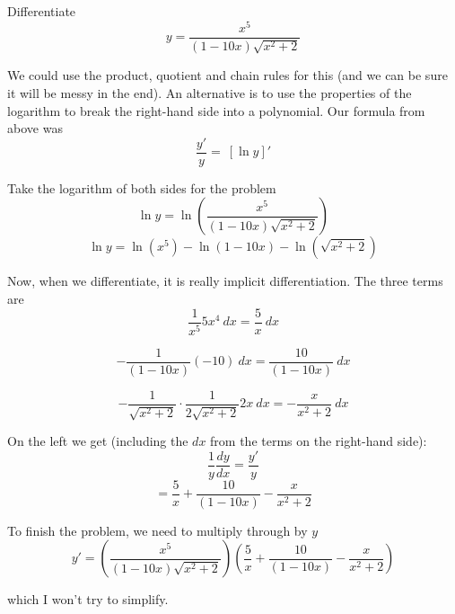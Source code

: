 \documentclass[11pt, oneside]{article}
\begin{document}
Differentiate
\[ y = \frac{x^5}{(1-10x)\sqrt{x^2+2}} \]

We could use the product, quotient and chain rules for this (and we can be sure it will be messy in the end).  An alternative is to use the properties of the logarithm to break the right-hand side into a polynomial.  Our formula from above was
\[ \frac{y'}{y} =  \ [ \ln y ]' \]

Take the logarithm of both sides for the problem
\[ \ln y = \ln (\frac{x^5}{(1-10x)\sqrt{x^2+2}} ) \]
\[   \ln y = \ln(x^5) - \ln(1-10x) - \ln(\sqrt{x^2+2}) \]

Now, when we differentiate, it is really implicit differentiation.  The three terms are
\[  \frac{1}{x^5} 5x^4 \ dx  = \frac{5}{x} \ dx \]

\[ -\frac{1}{(1-10x)} (-10) \ dx = \frac{10}{(1-10x)} \ dx \]

\[  - \frac{1}{\sqrt{x^2+2}} \cdot \frac{1}{2\sqrt{x^2+2}} 2x \ dx = - \frac{x}{x^2 + 2}  \ dx \]

On the left we get (including the $dx$ from the terms on the right-hand side):
\[  \frac{1}{y} \frac{dy}{dx} = \frac{y'}{y} \]
\[  =   \frac{5}{x} + \frac{10}{(1-10x)} - \frac{x}{x^2 + 2} \]

To finish the problem, we need to multiply through by $y$
\[  y' = (\frac{x^5}{(1-10x)\sqrt{x^2+2}}) ( \frac{5}{x} + \frac{10}{(1-10x)} - \frac{x}{x^2 + 2}) \]

which I won't try to simplify.
\end{document}
